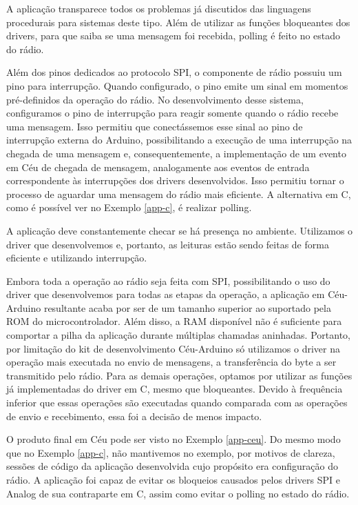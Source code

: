 \documentclass[11pt]{article}
\begin{document}
\par A aplicação transparece todos os problemas já discutidos das linguagens procedurais para sistemas deste tipo. Além de utilizar as funções bloqueantes dos drivers, para que saiba se uma mensagem foi recebida, polling é feito no estado do rádio.
\par Além dos pinos dedicados ao protocolo SPI, o componente de rádio possuiu um pino para interrupção. Quando configurado, o pino emite um sinal em momentos pré-definidos da operação do rádio. No desenvolvimento desse sistema, configuramos o pino de interrupção para reagir somente quando o rádio recebe uma mensagem. Isso permitiu que conectássemos esse sinal ao pino de interrupção externa do Arduino, possibilitando a execução de uma interrupção na chegada de uma mensagem e, consequentemente, a implementação de um evento em Céu de chegada de mensagem, analogamente aos eventos de entrada correspondente às interrupções dos drivers desenvolvidos. Isso permitiu tornar o processo de aguardar uma mensagem do rádio mais eficiente. A alternativa em C, como é possível ver no Exemplo \ref{app-c}, é realizar polling.
\par A aplicação deve constantemente checar se há presença no ambiente. Utilizamos o driver que desenvolvemos e, portanto, as leituras estão sendo feitas de forma eficiente e utilizando interrupção.
\par Embora toda a operação ao rádio seja feita com SPI, possibilitando o uso do driver que desenvolvemos para todas as etapas da operação, a aplicação em Céu-Arduino resultante acaba por ser de um tamanho superior ao suportado pela ROM do microcontrolador. Além disso, a RAM disponível não é suficiente para comportar a pilha da aplicação durante múltiplas chamadas aninhadas. Portanto, por limitação do kit de desenvolvimento Céu-Arduino só utilizamos o driver na operação mais executada no envio de mensagens, a transferência do byte a ser transmitido pelo rádio. Para as demais operações, optamos por utilizar as funções já implementadas do driver em C, mesmo que bloqueantes. Devido à frequência inferior que essas operações são executadas quando comparada com as operações de envio e recebimento, essa foi a decisão de menos impacto. 
\par O produto final em Céu pode ser visto no Exemplo \ref{app-ceu}. Do mesmo modo que no Exemplo \ref{app-c}, não mantivemos no exemplo, por motivos de clareza, sessões de código da aplicação desenvolvida cujo propósito era configuração do rádio. A aplicação foi capaz de evitar os bloqueios causados pelos drivers SPI e Analog de sua contraparte em C, assim como evitar o polling no estado do rádio.
\end{document}

